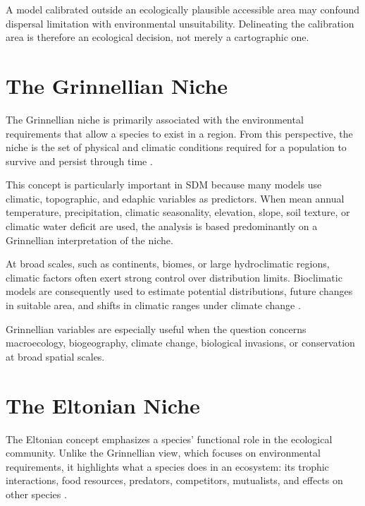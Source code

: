 \begin{atencao}
A model calibrated outside an ecologically plausible accessible area may
confound dispersal limitation with environmental unsuitability. Delineating the
calibration area is therefore an ecological decision, not merely a cartographic
one.
\end{atencao}

\section{The Grinnellian Niche}

The Grinnellian niche is primarily associated with the environmental
requirements that allow a species to exist in a region. From this perspective,
the niche is the set of physical and climatic conditions required for a
population to survive and persist through time
\parencite{grinnell1917,soberon2007}.

This concept is particularly important in SDM because many models use climatic,
topographic, and edaphic variables as predictors. When mean annual temperature,
precipitation, climatic seasonality, elevation, slope, soil texture, or climatic
water deficit are used, the analysis is based predominantly on a Grinnellian
interpretation of the niche.

At broad scales, such as continents, biomes, or large hydroclimatic regions,
climatic factors often exert strong control over distribution limits.
Bioclimatic models are consequently used to estimate potential distributions,
future changes in suitable area, and shifts in climatic ranges under climate
change \parencite{guisan2005predicting,elith2009,guisan2017habitat}.

\begin{dica}[title={\faLightbulb\quad Tip}]
Grinnellian variables are especially useful when the question concerns
macroecology, biogeography, climate change, biological invasions, or
conservation at broad spatial scales.
\end{dica}

\section{The Eltonian Niche}

The Eltonian concept emphasizes a species' functional role in the ecological
community. Unlike the Grinnellian view, which focuses on environmental
requirements, it highlights what a species does in an ecosystem: its trophic
interactions, food resources, predators, competitors, mutualists, and effects
on other species \parencite{elton1927,soberon2007}.

